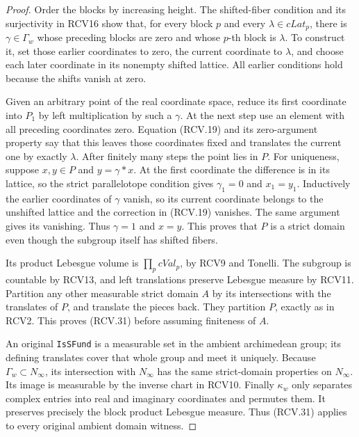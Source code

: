 \begin{proof}
Order the blocks by increasing height.  The shifted-fiber condition
and its surjectivity in RCV16 show that, for every block \(p\)
and every \(\lambda\in cLat_p\), there is \(\gamma\in\Gamma_w\)
whose preceding blocks are zero and whose \(p\)-th block is
\(\lambda\).  To construct it, set those earlier coordinates to
zero, the current coordinate to \(\lambda\), and choose each
later coordinate in its nonempty shifted lattice.  All earlier
conditions hold because the shifts vanish at zero.

Given an arbitrary point of the real coordinate space, reduce its
first coordinate into \(P_1\) by left multiplication by such a
\(\gamma\).  At the next step use an element with all preceding
coordinates zero.  Equation (RCV.19) and its zero-argument property
say that this leaves those coordinates fixed and translates the
current one by exactly \(\lambda\).  After finitely many steps
the point lies in \(P\).  For uniqueness, suppose \(x,y\in P\)
and \(y=\gamma*x\).  At the first coordinate the difference
is in its lattice, so the strict parallelotope condition gives
\(\gamma_1=0\) and \(x_1=y_1\).  Inductively the earlier
coordinates of \(\gamma\) vanish, so its current coordinate
belongs to the unshifted lattice and the correction in (RCV.19)
vanishes.  The same argument gives its vanishing.  Thus
\(\gamma=1\) and \(x=y\).  This proves that \(P\) is a
strict domain even though the subgroup itself has shifted fibers.

Its product Lebesgue volume is \(\prod_pcVal_p\), by RCV9 and
Tonelli.  The subgroup is countable by RCV13, and left translations
preserve Lebesgue measure by RCV11.  Partition any other measurable
strict domain \(A\) by its intersections with the translates of
\(P\), and translate the pieces back.  They partition \(P\),
exactly as in RCV2.  This proves (RCV.31) before assuming finiteness
of \(A\).

An original \texttt{IsSFund} is a measurable set in the ambient
archimedean group; its defining translates cover that whole group
and meet it uniquely.  Because \(\Gamma_w\subset N_\infty\),
its intersection with \(N_\infty\) has the same strict-domain
properties on \(N_\infty\).  Its image is measurable by the
inverse chart in RCV10.  Finally \(\kappa_w\) only separates
complex entries into real and imaginary coordinates and permutes
them.  It preserves precisely the block product Lebesgue measure.
Thus (RCV.31) applies to every original ambient domain witness.
\end{proof}

